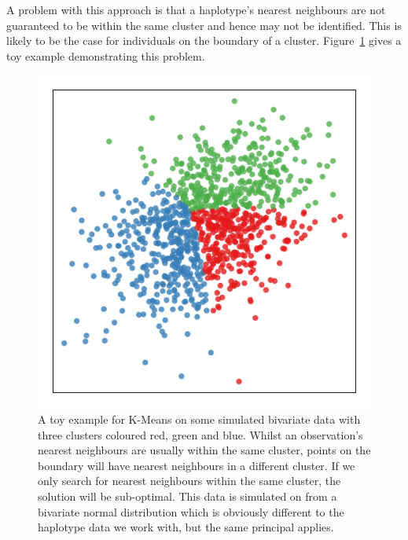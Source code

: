 A problem with this approach is that a haplotype's nearest neighbours are not guaranteed to be within the same cluster  and hence may not be identified.  This is likely to be the case  for individuals on the boundary of a cluster. Figure~\ref{chap5:kmeans} gives a toy example demonstrating this problem. 
\begin{figure}
  \centering
  \includegraphics[width=.45\textwidth]{chap5figs/kmeans-example}
  \caption[K-Means toy example]{A toy example for K-Means on some simulated bivariate data with three clusters coloured red, green and blue.  Whilst  an observation's nearest neighbours are usually within the same cluster, points on the boundary will have nearest neighbours in a different cluster.  If we only search for nearest neighbours within the same cluster, the solution will be sub-optimal. This data is simulated on from a bivariate normal distribution which is obviously different to the haplotype data we work with, but the same principal applies.\label{chap5:kmeans}}
\end{figure}


